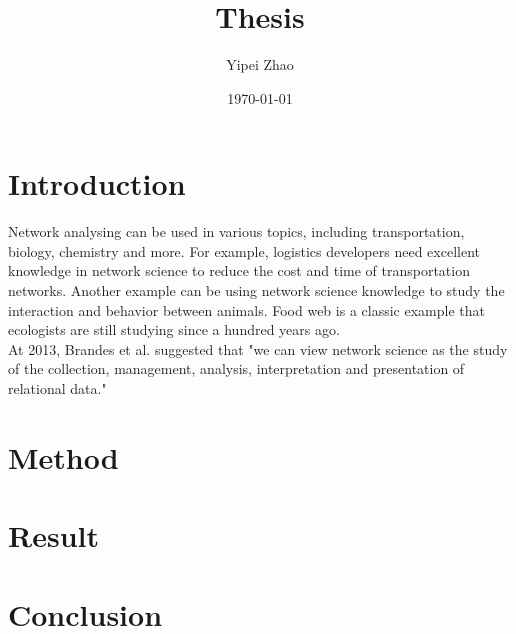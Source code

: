 \documentclass{article}
\title{Thesis}
\author{Yipei Zhao}
\date{\today}
\begin{document}
\maketitle

\section{Introduction}
Network analysing can be used in various topics, including transportation, biology, chemistry and more. For example, logistics developers need excellent knowledge in network science to reduce the cost and time of transportation networks. Another example can be using network science knowledge to study the interaction and behavior between animals. Food web is a classic example that ecologists are still studying since a hundred years ago.
\\
At 2013, Brandes et al. \cite{brandes_robins_mccranie_wasserman_2013} suggested that "we can view network science as the study of the collection, management, analysis, interpretation and presentation of relational data."
\section{Method}

\section{Result}

\section{Conclusion}

\printbibliography
\end{document}
